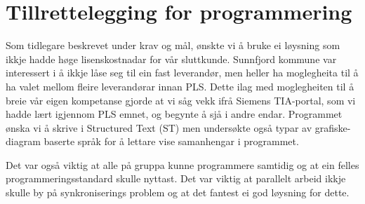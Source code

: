 \chapter{Tillrettelegging for programmering}
\thispagestyle{fancy}
\label{sec:5} 

Som tidlegare beskrevet under krav og mål, ønskte vi å bruke ei løysning som ikkje hadde høge lisenskostnadar for vår sluttkunde. 
Sunnfjord kommune var interessert i å ikkje låse seg til ein fast leverandør, men heller ha moglegheita til å ha valet mellom fleire 
leverandørar innan PLS. Dette ilag med moglegheiten til å breie vår eigen kompetanse 
gjorde at vi såg vekk ifrå Siemens TIA-portal, som vi hadde lært igjennom PLS emnet, 
og begynte å sjå i andre endar.
Programmet ønska vi å skrive i Structured Text (ST) men undersøkte også 
typar av grafiske-diagram baserte språk for å lettare vise samanhengar i programmet.

Det var også viktig at alle på gruppa kunne programmere samtidig og at ein felles programmeringsstandard skulle nyttast.
Det var viktig at parallelt arbeid ikkje skulle by på synkroniserings problem og at det fantest ei god løysning for dette.

